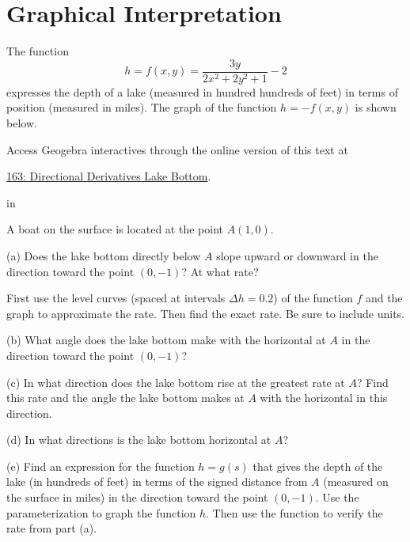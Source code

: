 \documentclass{ximera}
\newcommand{\pskip}{\vskip 0.1 in}
\begin{document}
\section{Graphical Interpretation}
\begin{exploration} \label{Esdft4ew3}

The function
\[
     h = f(x,y) = \frac{3y}{2x^2+2y^2+1}-2 
\]
expresses the depth of a lake (measured in hundred hundreds of feet) in terms of position (measured in miles). The graph of the function $h= - f(x,y)$ is shown below.

 
\begin{onlineOnly}
    \begin{center}
\end{center}
\end{onlineOnly}

Access Geogebra interactives through the online version of this text at
 
\href{https://www.geogebra.org/classic/md2udchf}{163: Directional Derivatives Lake Bottom}.

\pskip

A boat on the surface is located at the point $A(1,0)$.

(a) Does the lake bottom directly below $A$ slope upward or downward in the direction toward the point $(0,-1)$? At what rate? 

First use the level curves (spaced at intervals $\Delta h = 0.2$) of the function $f$ and the graph to approximate the rate. Then find the exact rate. Be sure to include units.

(b) What angle does the lake bottom make with the horizontal at $A$ in the direction toward the point $(0,-1)$?

(c) In what direction does the lake bottom rise at the greatest rate at $A$? Find this rate and the angle the lake bottom makes at $A$ with the horizontal in this direction.

(d) In what directions is the lake bottom horizontal at $A$?

(e) Find an expression for the function $h=g(s)$ that gives the depth of the lake (in hundreds of feet) in terms of the signed distance from $A$ (measured on the surface in miles) in the direction toward the point $(0,-1)$. Use the parameterization to graph the function $h$. Then use the function to verify the rate from part (a). 

\end{exploration}
\end{document}
